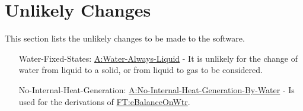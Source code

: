 \documentclass[12pt]{article}
\begin{document}
\section{Unlikely Changes}
\label{Sec:UCs}
This section lists the unlikely changes to be made to the software.

\begin{itemize}
\item[Water-Fixed-States:\phantomsection\label{unlikeChgWFS}]{\hyperref[assumpWAL]{A:Water-Always-Liquid} - It is unlikely for the change of water from liquid to a solid, or from liquid to gas to be considered.}
\item[No-Internal-Heat-Generation:\phantomsection\label{unlikeChgNIHG}]{\hyperref[assumpNIHGBW]{A:No-Internal-Heat-Generation-By-Water} - Is used for the derivations of \hyperref[FT:eBalanceOnWtr]{FT:eBalanceOnWtr}.}
\end{itemize}
\end{document}
